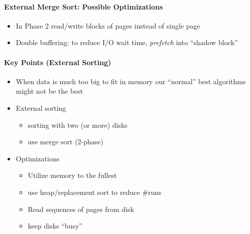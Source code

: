 \paragraph{External Merge Sort: Possible Optimizations}
\begin{itemize}
\item In Phase 2 read/write blocks of pages instead of single page
\item Double buffering: to reduce I/O wait time, \textit{prefetch}
  into ``shadow block''
\end{itemize}

\paragraph{Key Points (External Sorting)}
\begin{itemize}
\item When data is much too big to fit in memory our
  ``normal'' best algorithms might not be the best
\item External sorting
  \begin{itemize}
  \item sorting with two (or more) disks
  \item use merge sort (2-phase)
  \end{itemize}
\item Optimizations
  \begin{itemize}
  \item Utilize memory to the fullest
  \item use heap/replacement sort to reduce \#runs
  \item Read sequences of pages from disk
  \item keep disks ``busy''
  \end{itemize}
\end{itemize}
